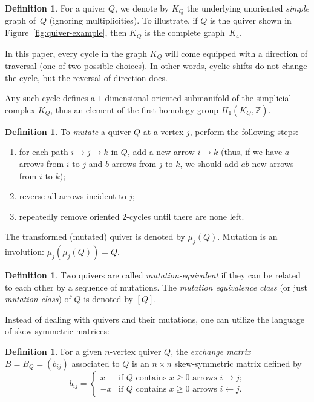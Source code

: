 \documentclass[11pt, letterpaper]{amsart}
\theoremstyle{definition}
\newtheorem{definition}[theorem]{Definition}
\numberwithin{equation}{section}
\def\ZZ{{\mathbb Z}}
\newcommand\GQ{K_Q}
\begin{document}
\begin{definition}
\label{def:Graph-Q}
For a quiver $Q$, we denote by $\GQ$ the underlying unoriented \emph{simple} graph of~$Q$ 
(ignoring multiplicities). 
To illustrate, if $Q$ is the quiver shown in Figure~\ref{fig:quiver-example}, 
then $\GQ$ is the complete graph~$K_4$.

In this paper, every cycle in the graph $\GQ$ will come equipped with a direction of traversal 
(one of two possible choices). 
In other words, cyclic shifts do not change the cycle, but the reversal of direction does. 

Any such cycle defines a $1$-dimensional oriented submanifold of the simplicial complex $\GQ$, 
thus an element of the first homology group $H_1(\GQ,\ZZ)$. 
\end{definition}


\begin{definition} 
To \emph{mutate} a quiver $Q$ at a vertex $j$, perform the following steps:
\begin{enumerate}
\item for each path $i \rightarrow j \rightarrow k$ in $Q$, add a new arrow $i \rightarrow k$ (thus, if we have $a$ arrows from $i$ to $j$ and $b$ arrows from $j$ to $k$, we should add $ab$ new arrows from $i$ to $k$); 
\item reverse all arrows incident to $j$; 
\item repeatedly remove oriented $2$-cycles until there are none left.
\end{enumerate}
The transformed (mutated) quiver is denoted by $\mu_j(Q)$. Mutation is an involution: $\mu_j(\mu_j(Q))=Q$. 
\end{definition}


\begin{definition} 
Two quivers are called \emph{mutation-equivalent} if they can be related to each other by a sequence of mutations. 
The \emph{mutation equivalence class} (or just \emph{mutation class}) of $Q$ is denoted by $[Q]$.
\end{definition}

\pagebreak[3]


Instead of dealing with quivers and their mutations, one can utilize the language 
of skew-symmetric matrices: 

\begin{definition}
For a given $n$-vertex quiver $Q$, the \emph{exchange matrix} 
$B=B_Q = (b_{ij})$ associated to $Q$ is an $n \times n$ skew-symmetric matrix 
defined by 
\begin{equation*}
b_{ij} = \begin{cases}
x & \text{if $Q$ contains $x\ge0$ arrows $i \rightarrow j$;} \\
-x & \text{if $Q$ contains $x\ge0$ arrows $i \leftarrow j$.}
\end{cases}
\end{equation*}
\end{definition}
\end{document}
